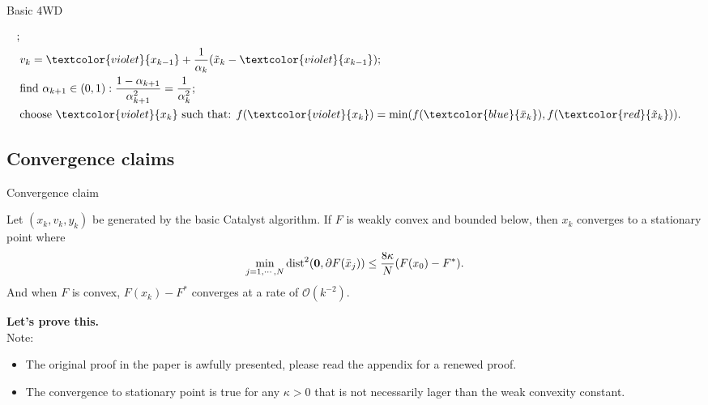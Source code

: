\documentclass[11pt]{beamer}
\begin{document}
\begin{frame}{Basic 4WD}
\begin{definition}
{\begin{align*}
                    ;
                    \\
                    & v_{k} = \textcolor{violet}{x_{k - 1}} + \frac{1}{\alpha_k}(\tilde x_k - \textcolor{violet}{x_{k - 1}});
                    \\
                    & 
                    \text{find } \alpha_{k + 1} \in (0, 1): 
                    \frac{1 - \alpha_{k + 1}}{\alpha_{k + 1}^2} = \frac{1}{\alpha_k^2};
                    \\
                    & \text{choose } \textcolor{violet}{x_k} \text{ such that:  } 
                    f(\textcolor{violet}{x_k}) = \min(f(\textcolor{blue}{\bar x_k}), f(\textcolor{red}{\tilde x_k})). 
                \end{align*}
            }
            \end{definition}
        \end{frame}
    \subsection{Convergence claims}
        \begin{frame}{Convergence claim}
            \begin{theorem}
                Let $(x_k, v_k, y_k)$ be generated by the basic Catalyst algorithm. 
                If $F$ is weakly convex and bounded below, then $x_k$ converges to a stationary point where
                \begin{align*}
                    \min_{j = 1, \cdots, N} \operatorname{dist}^2(\mathbf 0, \partial F(\bar x_j))
                    \le \frac{8 \kappa}{N}(F(x_0) - F^*). 
                \end{align*}
                And when $F$ is convex, $F(x_k) - F^*$ converges at a rate of $\mathcal O(k^{-2})$. 
            \end{theorem}
            \pause
            \textbf{Let's prove this.} 
            \\
            Note: 
            \begin{itemize}
                \item The original proof in the paper is awfully presented, please read the appendix for a renewed proof. 
                \item The convergence to stationary point is true for any $\kappa > 0$ that is not necessarily lager than the weak convexity constant. 
            \end{itemize}
        \end{frame}
\end{document}
